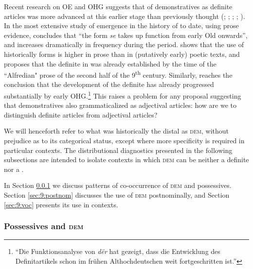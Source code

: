 \documentclass[output=paper,colorlinks,citecolor=brown]{langscibook}
\begin{document}
Recent research on OE and OHG suggests that  of demonstratives as definite articles was more advanced at this earlier stage than previously thought (\citealt{Wood2007}; \citealt{Crisma2011}; \citealt{Sommerer2018}; \citealt{Allen2019}; \citealt{Flick2020}). In the most extensive study of  emergence in the history of  to date, using prose evidence, \citet[312]{Sommerer2018} concludes that ``the form \emph{se} takes up  function from early Old  onwards'', and increases dramatically in frequency during the period. \citet{Crisma2011} shows that the use of historically  forms is higher in prose than in (putatively early) poetic texts, and proposes that the definite  in  was already established by the time of the ``Alfredian" prose of the second half of the 9\textsuperscript{th} century. Similarly, \citet[207]{Flick2020} reaches the conclusion that the development of the definite  has already progressed substantially by early OHG.\footnote{``Die Funktionsanalyse von \emph{dër} hat gezeigt, dass die Entwicklung des Definitartikels schon im frühen Althochdeutschen weit fortgeschritten ist.''} This raises a problem for any proposal suggesting that demonstratives also grammaticalized as adjectival articles: how are we to distinguish definite articles from adjectival articles?

We will henceforth refer to what was historically the distal  as \textsc{dem}, without prejudice as to its categorical status, except where more specificity is required in particular contexts. The distributional diagnostics presented in the following subsections are intended to isolate contexts in which \textsc{dem} can be neither a definite  nor a . 



In Section \ref{sec:9:poss-dem} we discuss patterns of co-occurrence of \textsc{dem} and possessives. Section \ref{sec:9:postnom} discusses the use of \textsc{dem} postnominally, and Section \ref{sec:9:voc} presents its use in  contexts.

\subsubsection{Possessives and \textsc{dem}}\label{sec:9:poss-dem}
\end{document}
